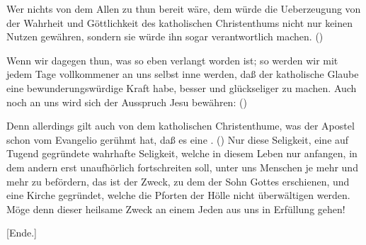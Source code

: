 \begin{aufza}
\begin{aufzb}
\end{aufzb}
\item Wer nichts von dem Allen zu thun bereit wäre, dem würde die Ueberzeugung von der Wahrheit und Göttlichkeit des katholischen Christenthums nicht nur keinen Nutzen gewähren, sondern sie würde ihn sogar verantwortlich machen.  ()
\item Wenn wir dagegen thun, was so eben verlangt worden ist; so werden wir mit jedem Tage vollkommener an uns selbst inne werden, daß der katholische Glaube eine bewunderungswürdige Kraft habe, besser und glückseliger zu machen. Auch noch an uns wird sich der Ausspruch Jesu bewähren:  ()\par
Denn allerdings gilt auch von dem katholischen Christenthume, was der Apostel schon vom Evangelio gerühmt hat, daß es eine . () Nur diese Seligkeit, eine auf Tugend gegründete wahrhafte Seligkeit, welche in diesem Leben nur anfangen, in dem andern erst unaufhörlich fortschreiten soll, unter uns Menschen je mehr und mehr zu befördern, das ist der Zweck, zu dem der Sohn Gottes erschienen, und eine Kirche gegründet, welche die Pforten der Hölle nicht überwältigen werden. Möge denn dieser heilsame Zweck an einem Jeden aus uns in Erfüllung gehen!
\end{aufza}

\begin{center}[Ende.]\end{center}
\endinput